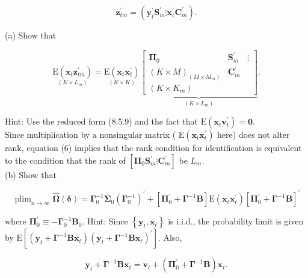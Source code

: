 \documentclass[10pt]{article}
\begin{document}
$$
\mathbf{z}_{t m}^{\prime}=\left(\mathbf{y}_{t}^{\prime} \mathbf{S}_{m}^{\prime} \vdots \mathbf{x}_{t}^{\prime} \mathbf{C}_{m}^{\prime}\right) .
$$

(a) Show that

\[
\underset{\left(K \times L_{m}\right)}{\mathrm{E}\left(\mathbf{x}_{t} \mathbf{z}_{t m}^{\prime}\right)}=\underset{(K \times K)}{\mathrm{E}\left(\mathbf{x}_{t} \mathbf{x}_{t}^{\prime}\right)} \underbrace{\left[\begin{array}{ccc}
\mathbf{\Pi}_{0} & \mathbf{S}_{m}^{\prime} & \vdots  \tag{6}\\
(K \times M)_{\left(M \times M_{m}\right)} & \mathbf{C}_{m}^{\prime} \\
\left(K \times K_{m}\right)
\end{array}\right]}_{\left(K \times L_{m}\right)} .
\]

Hint: Use the reduced form (8.5.9) and the fact that $\mathrm{E}\left(\mathbf{x}_{t} \mathbf{v}_{t}^{\prime}\right)=\mathbf{0}$.\\
Since multiplication by a nonsingular matrix ( $\mathrm{E}\left(\mathbf{x}_{t} \mathbf{x}_{t}^{\prime}\right)$ here) does not alter rank, equation (6) implies that the rank condition for identification is equivalent to the condition that the rank of $\left[\boldsymbol{\Pi}_{0} \boldsymbol{S}_{m}^{\prime} \vdots \boldsymbol{C}_{m}^{\prime}\right]$ be $L_{m}$.\\
(b) Show that


\begin{equation*}
\operatorname{plim}_{n \rightarrow \infty} \widehat{\boldsymbol{\Omega}}(\boldsymbol{\delta})=\boldsymbol{\Gamma}_{0}^{-1} \boldsymbol{\Sigma}_{0}\left(\boldsymbol{\Gamma}_{0}^{-1}\right)^{\prime}+\left[\boldsymbol{\Pi}_{0}^{\prime}+\boldsymbol{\Gamma}^{-1} \mathbf{B}\right] \mathrm{E}\left(\mathbf{x}_{t} \mathbf{x}_{t}^{\prime}\right)\left[\boldsymbol{\Pi}_{0}^{\prime}+\boldsymbol{\Gamma}^{-1} \mathbf{B}\right]^{\prime} \tag{7}
\end{equation*}


where $\boldsymbol{\Pi}_{0}^{\prime} \equiv-\boldsymbol{\Gamma}_{0}^{-1} \mathbf{B}_{0}$. Hint: Since $\left\{\mathbf{y}_{t}, \mathbf{x}_{t}\right\}$ is i.i.d., the probability limit is given by $\mathrm{E}\left[\left(\mathbf{y}_{t}+\boldsymbol{\Gamma}^{-1} \mathbf{B} \mathbf{x}_{t}\right)\left(\mathbf{y}_{t}+\boldsymbol{\Gamma}^{-1} \mathbf{B} \mathbf{x}_{t}\right)^{\prime}\right]$. Also,

$$
\mathbf{y}_{t}+\boldsymbol{\Gamma}^{-1} \mathbf{B} \mathbf{x}_{t}=\mathbf{v}_{t}+\left(\boldsymbol{\Pi}_{0}^{\prime}+\boldsymbol{\Gamma}^{-1} \mathbf{B}\right) \mathbf{x}_{t} .
$$
\end{document}
